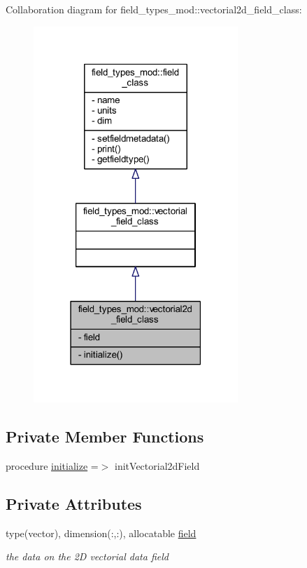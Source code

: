Collaboration diagram for field\+\_\+types\+\_\+mod\+:\+:vectorial2d\+\_\+field\+\_\+class\+:\nopagebreak
\begin{figure}[H]
\begin{center}
\leavevmode
\includegraphics[width=219pt]{structfield__types__mod_1_1vectorial2d__field__class__coll__graph}
\end{center}
\end{figure}
\subsection*{Private Member Functions}
\begin{DoxyCompactItemize}
\item 
procedure \mbox{\hyperlink{structfield__types__mod_1_1vectorial2d__field__class_a980cf1e337727f794dccb411d5cd7413}{initialize}} =$>$ init\+Vectorial2d\+Field
\end{DoxyCompactItemize}
\subsection*{Private Attributes}
\begin{DoxyCompactItemize}
\item 
type(vector), dimension(\+:,\+:), allocatable \mbox{\hyperlink{structfield__types__mod_1_1vectorial2d__field__class_a542737e420815a5aecccd6edc939522b}{field}}
\begin{DoxyCompactList}\small\item\em the data on the 2D vectorial data field \end{DoxyCompactList}\end{DoxyCompactItemize}


